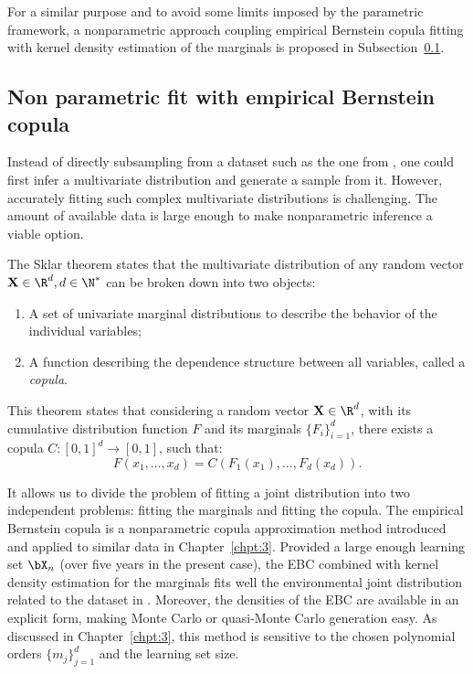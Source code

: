 For a similar purpose and to avoid some limits imposed by the parametric framework, 
a nonparametric approach coupling empirical Bernstein copula fitting with kernel density estimation of the marginals is proposed in Subsection~\ref{sec:4ebc}.


\subsection{Non parametric fit with empirical Bernstein copula}\label{sec:4ebc}
Instead of directly subsampling from a dataset such as the one from , one could first infer a multivariate distribution and generate a sample from it. 
However, accurately fitting such complex multivariate distributions is challenging. 
The amount of available data is large enough to make nonparametric inference a viable option.

The Sklar theorem \citep{durante_2015_copula} states that the multivariate distribution of any random vector $\mathbf{X} \in \R^d, d \in \N^*$ can be broken down into two objects:
\begin{enumerate}
    \item A set of univariate marginal distributions to describe the behavior of the individual variables;
    \item A function describing the dependence structure between all variables, called a \textit{copula}.
\end{enumerate}
This theorem states that considering a random vector $\mathbf{X} \in \R^d$, with its cumulative distribution function $F$ and its marginals $\{F_i\}_{i=1}^d$, there exists a copula $C: [0, 1]^d \rightarrow [0, 1]$, such that:
\begin{equation}
    F(x_1, \dots, x_d) = C\left(F_1(x_1), \dots, F_d(x_d)\right). 
\end{equation}

It allows us to divide the problem of fitting a joint distribution into two independent problems: fitting the marginals and fitting the copula. 
The empirical Bernstein copula is a nonparametric copula approximation method introduced and applied to similar data in Chapter~\ref{chpt:3}. 
Provided a large enough learning set $\bX_n$ (over five years in the present case), the EBC combined with kernel density estimation for the marginals fits well the environmental joint distribution related to the dataset in . 
Moreover, the densities of the EBC are available in an explicit form, making Monte Carlo or quasi-Monte Carlo generation easy. 
As discussed in Chapter~\ref{chpt:3}, this method is sensitive to the chosen polynomial orders $\{m_j\}_{j=1}^d$ and the learning set size. 


